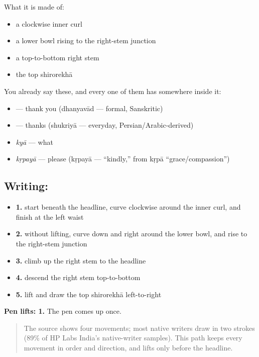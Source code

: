 What it is made of:

\begin{itemize}
\raggedright
  \item a clockwise inner curl
  \item a lower bowl rising to the right-stem junction
  \item a top-to-bottom right stem
  \item the top shirorekhā
\end{itemize}

You already say these, and every one of them has  somewhere inside it:

\begin{itemize}
\raggedright
  \item \textbf{} — thank you (dhanyavād — formal, Sanskritic)
  \item \textbf{} — thanks (shukriyā — everyday, Persian/Arabic-derived)
  \item \textbf{} \emph{kyā} — what
  \item \textbf{} \emph{kṛpayā} — please (kṛpayā — \textquotedblleft{}kindly,\textquotedblright{} from kṛpā \textquotedblleft{}grace/compassion\textquotedblright{})
\end{itemize}

\subsection*{Writing: }

\begin{itemize}
\raggedright
  \item \textbf{1.} start beneath the headline, curve clockwise around the inner curl, and finish at the left waist
  \item \textbf{2.} without lifting, curve down and right around the lower bowl, and rise to the right-stem junction
  \item \textbf{3.} climb up the right stem to the headline
  \item \textbf{4.} descend the right stem top-to-bottom
  \item \textbf{5.} lift and draw the top shirorekhā left-to-right
\end{itemize}

\textbf{Pen lifts: 1.} The pen comes up once.

\begin{quote}
The source shows four movements; most native writers draw  in two strokes (89\% of HP Labs India's native-writer samples). This path keeps every movement in order and direction, and lifts only before the headline.
\end{quote}


